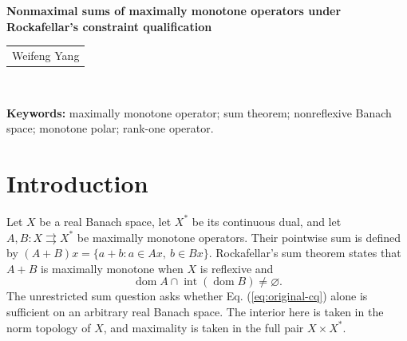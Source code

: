 \documentclass[11pt]{article}
\newcommand{\dom}{\operatorname{dom}}
\theoremstyle{definition}
\theoremstyle{remark}
\begin{document}
\begin{center}
{\Large\bfseries Nonmaximal sums of maximally monotone operators under Rockafellar’s constraint qualification}\\[10pt]
\begin{tabular}{c}
Weifeng Yang\footnotemark
\end{tabular}\\[10pt]
\end{center}


\begin{abstract}


We construct counterexamples to Rockafellar's sum conjecture in which two maximally monotone operators satisfy the interior-domain condition but their sum is not maximally monotone. We give one counterexample on $c_0$ and another on $\ell^1$ with its usual norm.
In both examples, the second operator is a bounded linear monotone operator of rank one defined on the whole space. 
We establish a general construction theorem that computes the entire monotone polar of a class of graphs, gives a necessary and sufficient condition for their maximal monotonicity, and shows how a positive rank-one perturbation produces a nonmaximal sum under this condition. By coupling triangular operators with a Lipschitz curve, we verify the theorem's hypotheses and its maximality criterion on $c_0$, thereby obtaining a counterexample to the conjecture. We then construct a bounded linear surjection from $\ell^1$ onto $c_0$ and use it to obtain the counterexample on $\ell^1$.

\end{abstract}


\noindent\textbf{Keywords:} maximally monotone operator; sum theorem;
nonreflexive Banach space; monotone polar; rank-one operator.

\section{Introduction}
\label{sec:introduction}
Let $X$ be a real Banach space, let $X^*$ be its continuous dual, and let $A,B:X\rightrightarrows X^*$ be maximally monotone operators. Their pointwise sum is defined by $(A+B)x=\{a+b:a\in Ax,\ b\in Bx\}$. Rockafellar's sum theorem \cite{rockafellar1970} states that $A+B$ is maximally monotone when $X$ is reflexive and
\begin{equation}
\dom A\cap\operatorname{int}(\dom B)\ne\varnothing.
\label{eq:original-cq}
\end{equation}
The unrestricted sum question asks whether Eq. (\ref{eq:original-cq}) alone is sufficient on an arbitrary real Banach space. The interior here is taken in the norm topology of $X$, and maximality is taken in the full pair $X\times X^*$.
\end{document}
